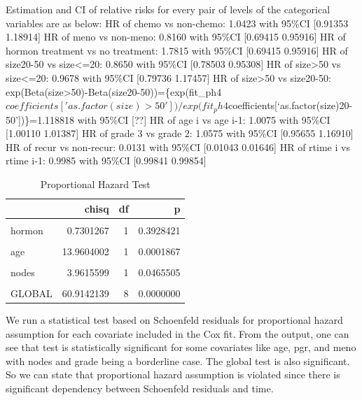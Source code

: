 \documentclass[
]{article}
\begin{document}
Estimation and CI of relative risks for every pair of levels of the
categorical variables are as below: HR of chemo vs non-chemo: 1.0423
with 95\%CI {[}0.91353 1.18914{]} HR of meno vs non-meno: 0.8160 with 95\%CI
{[}0.69415 0.95916{]} HR of hormon treatment vs no treatment: 1.7815 with
95\%CI {[}0.69415 0.95916{]} HR of size20-50 vs size\textless=20: 0.8650 with 95\%CI
{[}0.78503 0.95308{]} HR of size\textgreater50 vs size\textless=20: 0.9678 with 95\%CI
{[}0.79736 1.17457{]} HR of size\textgreater50 vs size20-50:
exp(Beta(size\textgreater50)-Beta(size20-50))=\{exp(fit\_ph4\(coefficients['as.factor(size)>50'])/exp(fit_ph4\)coefficients{[}`as.factor(size)20-50'{]})\}=1.118818
with 95\%CI {[}??{]} HR of age i vs age i-1: 1.0075 with 95\%CI {[}1.00110
1.01387{]} HR of grade 3 vs grade 2: 1.0575 with 95\%CI {[}0.95655 1.16910{]}
HR of recur vs non-recur: 0.0131 with 95\%CI {[}0.01043 0.01646{]} HR of
rtime i vs rtime i-1: 0.9985 with 95\%CI {[}0.99841 0.99854{]}

\begin{table}[!h]

\caption{\label{tab:unnamed-chunk-13}Proportional Hazard Test}
\centering
\begin{tabular}[t]{lrrr}
\toprule
  & chisq & df & p\\
\midrule
\cellcolor{gray!6}{meno} & \cellcolor{gray!6}{4.3296389} & \cellcolor{gray!6}{1} & \cellcolor{gray!6}{0.0374542}\\
hormon & 0.7301267 & 1 & 0.3928421\\
\cellcolor{gray!6}{as.factor(size)} & \cellcolor{gray!6}{5.2190506} & \cellcolor{gray!6}{2} & \cellcolor{gray!6}{0.0735695}\\
age & 13.9604002 & 1 & 0.0001867\\
\cellcolor{gray!6}{as.factor(grade)} & \cellcolor{gray!6}{3.1603999} & \cellcolor{gray!6}{1} & \cellcolor{gray!6}{0.0754447}\\
\addlinespace
nodes & 3.9615599 & 1 & 0.0465505\\
\cellcolor{gray!6}{pgr} & \cellcolor{gray!6}{41.7855085} & \cellcolor{gray!6}{1} & \cellcolor{gray!6}{0.0000000}\\
GLOBAL & 60.9142139 & 8 & 0.0000000\\
\bottomrule
\end{tabular}
\end{table}

We run a statistical test based on Schoenfeld residuals for proportional
hazard assumption for each covariate included in the Cox fit. From the
output, one can see that test is statistically significant for some
covariates like age, pgr, and meno with nodes and grade being a borderline case. The global test is also significant.
So we can state that proportional hazard assumption is violated since
there is significant dependency between Schoenfeld residuals and time.
\end{document}
